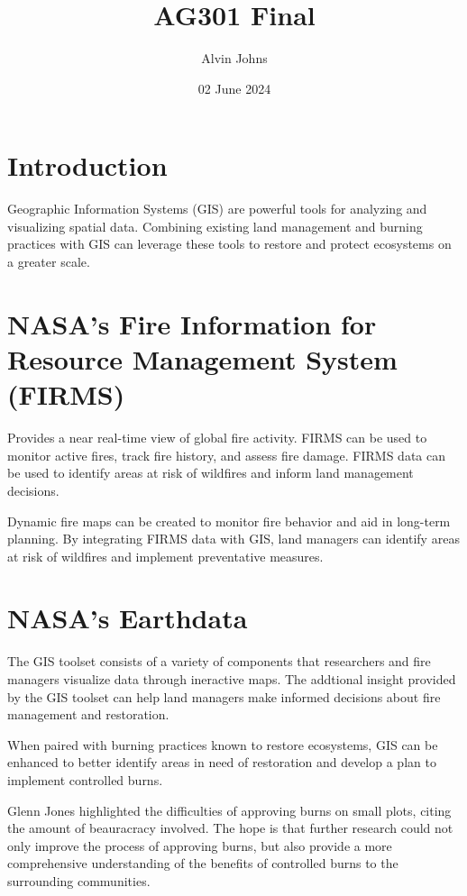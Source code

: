 \documentclass{article}
\title{AG301 Final}
\author{Alvin Johns}
\date{02 June 2024}
\begin{document}
\maketitle

\raggedright

\section*{Introduction}

Geographic Information Systems (GIS) are powerful tools for analyzing and visualizing spatial data. Combining existing land management and burning practices with GIS can leverage these tools to restore and protect ecosystems on a greater scale.\vspace{5mm}

\section*{NASA's Fire Information for Resource Management System (FIRMS)}
Provides a near real-time view of global fire activity. FIRMS can be used to monitor active fires, track fire history, and assess fire damage. FIRMS data can be used to identify areas at risk of wildfires and inform land management decisions.\vspace{5mm}

Dynamic fire maps can be created to monitor fire behavior and aid in long-term planning. By integrating FIRMS data with GIS, land managers can identify areas at risk of wildfires and implement preventative measures.\vspace{5mm}

\section*{NASA's Earthdata}
The GIS toolset consists of a variety of components that researchers and fire managers visualize data through ineractive maps. The addtional insight provided by the GIS toolset can help land managers make informed decisions about fire management and restoration. \vspace{5mm}

When paired with burning practices known to restore ecosystems, GIS can be enhanced to better identify areas in need of restoration and develop a plan to implement controlled burns. \vspace{5mm}

Glenn Jones highlighted the difficulties of approving burns on small plots, citing the amount of beauracracy involved. The hope is that further research could not only improve the process of approving burns, but also provide a more comprehensive understanding of the benefits of controlled burns to the surrounding communities.\vspace{5mm}
\end{document}
